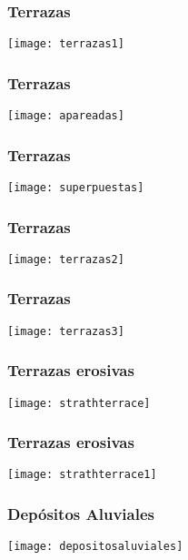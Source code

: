 \documentclass{beamer}
\begin{document}
\begin{frame}
\frametitle{Terrazas}
\begin{center}
   	\texttt{[image: terrazas1]}
\end{center}
\end{frame}
\begin{frame}
\frametitle{Terrazas}
\begin{center}
   	\texttt{[image: apareadas]}
\end{center}
\end{frame}
\begin{frame}
\frametitle{Terrazas}
\begin{center}
   	\texttt{[image: superpuestas]}
\end{center}
\end{frame}
\begin{frame}
\frametitle{Terrazas}
\begin{center}
   	\texttt{[image: terrazas2]}
\end{center}
\end{frame}
\begin{frame}
\frametitle{Terrazas}
\begin{center}
   	\texttt{[image: terrazas3]}
\end{center}
\end{frame}
\begin{frame}
\frametitle{Terrazas erosivas}
\begin{center}
   	\texttt{[image: strathterrace]}
\end{center}
\end{frame}
\begin{frame}
\frametitle{Terrazas erosivas}
\begin{center}
   	\texttt{[image: strathterrace1]}
\end{center}
\end{frame}
\begin{frame}
\frametitle{Depósitos Aluviales}
\begin{center}
   	\texttt{[image: depositosaluviales]}
\end{center}
\end{frame}
\end{document}
